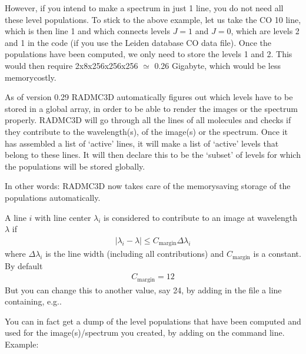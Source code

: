 \documentclass[letterpaper,10pt,english]{sphinxmanual}
\begin{document}
However, if you intend to make a spectrum in just 1 line, you do not need all
these level populations. To stick to the above example, let us take the CO 1\sphinxhyphen{}0
line, which is then line 1 and which connects levels \(J=1\) and
\(J=0\), which are levels 2 and 1 in the code (if you use the Leiden
database CO data file).  Once the populations have been computed, we only need
to store the levels 1 and 2. This would then require 2x8x256x256x256
\(\simeq\) 0.26 Gigabyte, which would be  less memory\sphinxhyphen{}costly.

As of version 0.29 RADMC\sphinxhyphen{}3D automatically figures out which levels have to
be stored in a global array, in order to be able to render the images or the
spectrum properly. RADMC\sphinxhyphen{}3D will go through all the lines of all molecules
and checks if they contribute to the wavelength(s), of the image(s) or the
spectrum. Once it has assembled a list of ‘active’ lines, it will make a
list of ‘active’ levels that belong to these lines. It will then declare
this to be the ‘subset’ of levels for which the populations will be stored
globally.

In other words: RADMC\sphinxhyphen{}3D now takes care of the memory\sphinxhyphen{}saving storage of
the populations automatically.

 A line \(i\) with line center \(\lambda_i\) is
considered to contribute to an image at wavelength \(\lambda\) if
\begin{equation*}
\begin{split}| \lambda_i-\lambda | \le C_{\mathrm{margin}}\Delta\lambda_i\end{split}
\end{equation*}
where \(\Delta\lambda_i\) is the line width (including all contributions)
and \(C_{\mathrm{margin}}\) is a constant. By default
\begin{equation*}
\begin{split}C_{\mathrm{margin}} = 12\end{split}
\end{equation*}
But you can change this to another value, say 24, by adding in the
 file a line containing, e.g..

You can in fact get a dump of the level populations that have been computed and
used for the image(s)/spectrum you created, by adding  on the
command line. Example:
\end{document}
